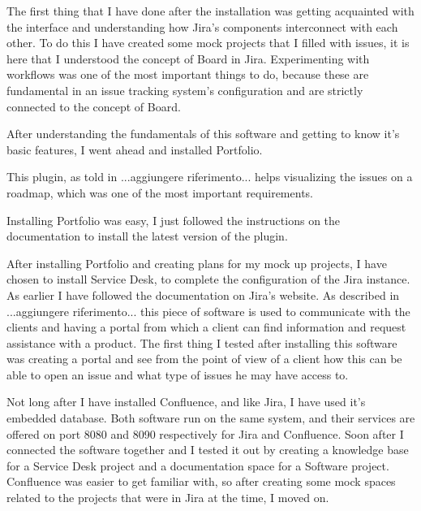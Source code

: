 	
	The first thing that I have done after the installation was getting acquainted with the interface and understanding how Jira's components interconnect with each other.
	To do this I have created some mock projects that I filled with issues, it is here that I understood the concept of Board in Jira.
	Experimenting with workflows was one of the most important things to do, because these are fundamental in an issue tracking system's configuration and are strictly connected to the concept of Board.
	
	
	After understanding the fundamentals of this software and getting to know it's basic features, I went ahead and installed Portfolio.
	
	This plugin, as told in ...aggiungere riferimento... helps visualizing the issues on a roadmap, which was one of the most important requirements.
	
	Installing Portfolio was easy, I just followed the instructions on the documentation to install the latest version of the plugin.
	
	
	After installing Portfolio and creating plans for my mock up projects, I have chosen to install Service Desk, to complete the configuration of the Jira instance.
	As earlier I have followed the documentation on Jira's website.
	As described in ...aggiungere riferimento... this piece of software is used to communicate with the clients and having a portal from which a client can find information and request assistance with a product.
	The first thing I tested after installing this software was creating a portal and see from the point of view of a client how this can be able to open an issue and what type of issues he may have access to.
	
	
	Not long after I have installed Confluence, and like Jira, I have used it's embedded database.
	Both software run on the same system, and their services are offered on port 8080 and 8090 respectively for Jira and Confluence.
	Soon after I connected the software together and I tested it out by creating a knowledge base for a Service Desk project and a documentation space for a Software project.
	Confluence was easier to get familiar with, so after creating some mock spaces related to the projects that were in Jira at the time, I moved on.

